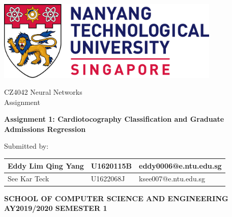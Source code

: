 \begin{titlepage}
\begin{center}

\includegraphics[width=0.8\textwidth]{assets/ntu_logo.png}

\vspace{3cm}

{\Large CZ4042 Neural Networks}
\\[0.5cm]
{\large Assignment}

\vspace{3.5cm}

\textbf{\large Assignment 1: Cardiotocography Classification and Graduate Admissions Regression}

\vspace{3.5cm}


\vspace{0.5cm}

Submitted by:

\begin{table}[!htbp]
\centering
\begin{tabular}{|l|l|l|}
\hline
Eddy Lim Qing Yang & U1620115B & eddy0006@e.ntu.edu.sg \\ \hline
See Kar Teck  & U1622068J & ksee007@e.ntu.edu.sg \\ \hline
\end{tabular}
\end{table}


\vspace{1.5cm}

\vfill

\bfseries SCHOOL OF COMPUTER SCIENCE AND ENGINEERING
\\
AY2019/2020 SEMESTER 1

\end{center}
\end{titlepage}